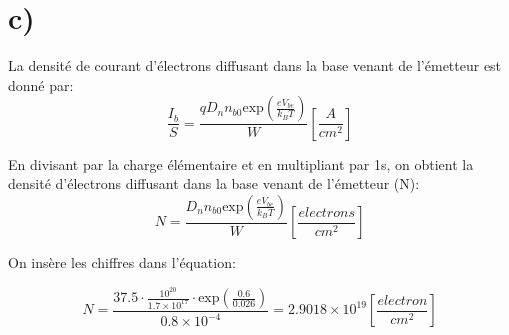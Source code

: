 \section*{c)}
La densité de courant d'électrons diffusant dans la base venant de l'émetteur est donné par:
\begin{equation}
\frac{I_b}{S} = \frac{q D_n n_{b0} \mbox{exp}\left(\frac{e V_{be}}{k_B T}\right)}{W}\left[\frac{A}{cm^2}\right]
\end{equation}

En divisant par la charge élémentaire et en multipliant par 1s, on obtient la densité d'électrons diffusant dans la base venant de l'émetteur (N):
\begin{equation}
N = \frac{D_n n_{b0} \mbox{exp}\left(\frac{e V_{be}}{k_B T}\right)}{W} \left[\frac{electrons}{cm^2}\right]
\end{equation}

On insère les chiffres dans l'équation:

\begin{equation}
N = \frac{37.5 \cdot \frac{10^{20}}{1.7\times10^{17}}\cdot \mbox{exp}\left(\frac{0.6}{0.026}\right)}{0.8\times10^{-4}} = 2.9018 \times 10^{19} \left[\frac{electron}{cm^2}\right]
\end{equation}